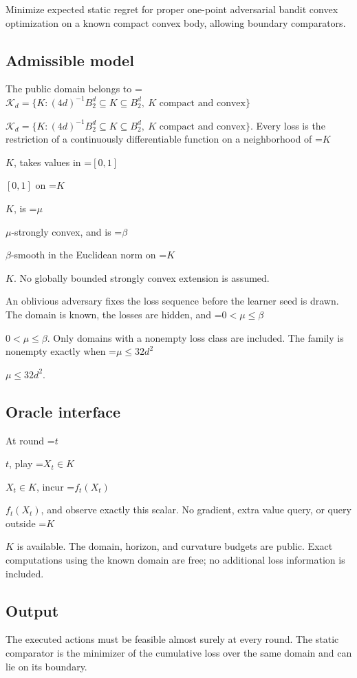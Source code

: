 \documentclass[10pt,a4paper]{article}
\newcommand{\AtlasMath}[1]{\par\begingroup\centering\setbox0=\hbox{$\displaystyle #1$}\ifdim\wd0>1.4\linewidth\typeout{ATLAS WIDE FORMULA: \the\wd0}\fi\ifdim\wd0>\linewidth\resizebox{\linewidth}{!}{\box0}\else\box0\fi\par\endgroup}
\newcommand{\AtlasInlineMath}[1]{\begingroup\setbox0=\hbox{$#1$}\ifdim\wd0>.4\linewidth\endgroup\AtlasMath{#1}\else\endgroup$#1$\fi}
\begin{document}
Minimize expected static regret for proper one-point adversarial bandit convex optimization on a known compact convex body, allowing boundary comparators.



\subsection{Admissible model}


The public domain belongs to \AtlasInlineMath{\mathcal K_d=\{K:(4d)^{-1}B_2^d\subseteq K\subseteq B_2^d,\ K\text{ compact and convex}\}}. Every loss is the restriction of a continuously differentiable function on a neighborhood of \AtlasInlineMath{K}, takes values in \AtlasInlineMath{[0,1]} on \AtlasInlineMath{K}, is \AtlasInlineMath{\mu}-strongly convex, and is \AtlasInlineMath{\beta}-smooth in the Euclidean norm on \AtlasInlineMath{K}. No globally bounded strongly convex extension is assumed.



An oblivious adversary fixes the loss sequence before the learner seed is drawn. The domain is known, the losses are hidden, and \AtlasInlineMath{0<\mu\le\beta}. Only domains with a nonempty loss class are included. The family is nonempty exactly when \AtlasInlineMath{\mu\le32d^2}.



\subsection{Oracle interface}


At round \AtlasInlineMath{t}, play \AtlasInlineMath{X_t\in K}, incur \AtlasInlineMath{f_t(X_t)}, and observe exactly this scalar. No gradient, extra value query, or query outside \AtlasInlineMath{K} is available. The domain, horizon, and curvature budgets are public. Exact computations using the known domain are free; no additional loss information is included.



\subsection{Output}


The executed actions must be feasible almost surely at every round. The static comparator is the minimizer of the cumulative loss over the same domain and can lie on its boundary.
\end{document}
